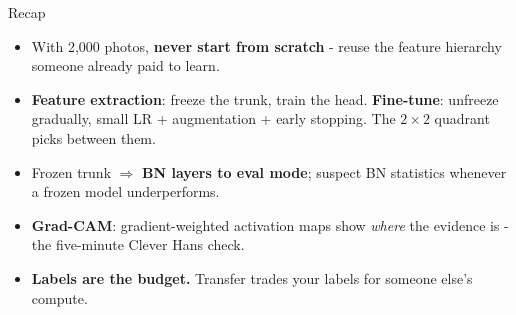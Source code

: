 \documentclass[aspectratio=169]{beamer}
\begin{document}
\begin{frame}{Recap}
  \begin{itemize}
    \item With 2,000 photos, \textbf{never start from scratch} - reuse the feature
      hierarchy someone already paid to learn.
    \item \textbf{Feature extraction}: freeze the trunk, train the head.
      \textbf{Fine-tune}: unfreeze gradually, small LR + augmentation + early stopping.
      The $2\times2$ quadrant picks between them.
    \item Frozen trunk $\Rightarrow$ \textbf{BN layers to eval mode}; suspect BN
      statistics whenever a frozen model underperforms.
    \item \textbf{Grad-CAM}: gradient-weighted activation maps show \emph{where} the
      evidence is - the five-minute Clever Hans check.
    \item \textbf{Labels are the budget.} Transfer trades your labels for someone else's
      compute.
  \end{itemize}
  \vskip 6pt
\end{frame}
\end{document}
